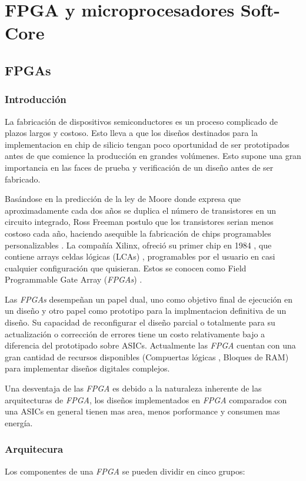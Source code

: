 
\chapter{FPGA y microprocesadores Soft-Core}
	

\section{FPGAs}

	\subsection{Introducción}
La fabricación de dispositivos semiconductores es un proceso complicado de plazos largos y costoso. Esto lleva a que los diseños destinados para la  implementacion en chip de silicio tengan poco oportunidad de ser prototipados antes de que comience la producción en grandes volúmenes. Esto supone una gran importancia  en las faces de prueba y verificación de un diseño antes de ser fabricado.

Basándose en la predicción de la ley de Moore donde expresa que aproximadamente cada dos años se duplica el número de transistores en un circuito integrado\cite{Etiqueta02}, Ross Freeman postulo que los transistores serian menos costoso cada año, haciendo asequible la fabricación de chips programables personalizables \cite{Etiqueta03}.
La compañía Xilinx, ofreció su primer chip en 1984 , que contiene arrays celdas lógicas (LCAs) , programables por el usuario en casi cualquier configuración que quisieran. Estos se conocen como Field Programmable Gate Array (\textit{FPGAs}) .

Las \textit{FPGAs} desempeñan un papel dual, uno como objetivo final de ejecución en un diseño y otro papel como prototipo para la implmentacion definitiva de un diseño. Su capacidad de reconfigurar el diseño parcial o totalmente para su actualización o corrección de errores tiene un costo relativamente bajo a diferencia del prototipado sobre ASICs.
Actualmente las \textit{FPGA} cuentan con una gran cantidad de recursos disponibles (Compuertas lógicas , Bloques de RAM) para implementar diseños digitales complejos.

Una desventaja de las \textit{FPGA}  es debido a la naturaleza inherente de las arquitecturas de \textit{FPGA}, los diseños implementados en \textit{FPGA} comparados con una ASICs en general tienen mas area, menos porformance y consumen mas energía.
		
	\subsection{Arquitecura}
Los componentes de una \textit{FPGA} se pueden dividir en cinco grupos:

